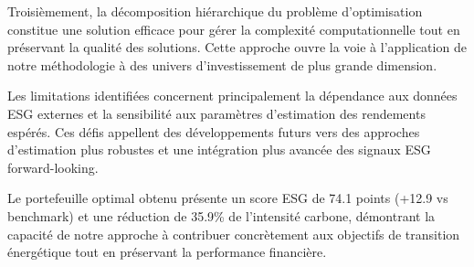 Troisièmement, la décomposition hiérarchique du problème d'optimisation constitue une solution efficace pour gérer la complexité computationnelle tout en préservant la qualité des solutions. Cette approche ouvre la voie à l'application de notre méthodologie à des univers d'investissement de plus grande dimension.

Les limitations identifiées concernent principalement la dépendance aux données ESG externes et la sensibilité aux paramètres d'estimation des rendements espérés. Ces défis appellent des développements futurs vers des approches d'estimation plus robustes et une intégration plus avancée des signaux ESG forward-looking.

Le portefeuille optimal obtenu présente un score ESG de 74.1 points (+12.9 vs benchmark) et une réduction de 35.9\% de l'intensité carbone, démontrant la capacité de notre approche à contribuer concrètement aux objectifs de transition énergétique tout en préservant la performance financière.

